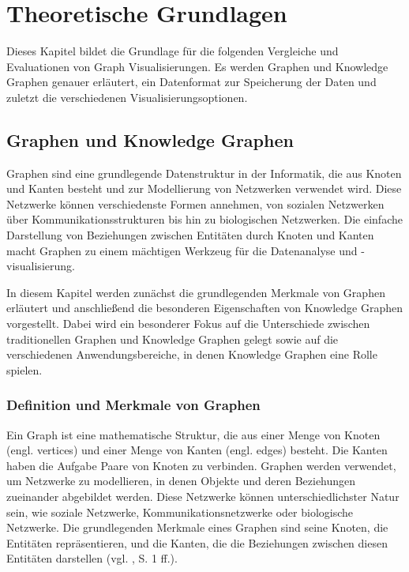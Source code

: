 
\chapter{Theoretische Grundlagen}
\label{theory}

Dieses Kapitel bildet die Grundlage für die folgenden Vergleiche und Evaluationen von Graph Visualisierungen. Es werden Graphen und Knowledge Graphen genauer erläutert, ein Datenformat zur Speicherung der Daten und zuletzt die verschiedenen Visualisierungsoptionen. 

\section{Graphen und Knowledge Graphen}

Graphen sind eine grundlegende Datenstruktur in der Informatik, die aus Knoten und Kanten besteht und zur Modellierung von Netzwerken verwendet wird. Diese Netzwerke können verschiedenste Formen annehmen, von sozialen Netzwerken über Kommunikationsstrukturen bis hin zu biologischen Netzwerken. Die einfache Darstellung von Beziehungen zwischen Entitäten durch Knoten und Kanten macht Graphen zu einem mächtigen Werkzeug für die Datenanalyse und -visualisierung.

In diesem Kapitel werden zunächst die grundlegenden Merkmale von Graphen erläutert und anschließend die besonderen Eigenschaften von Knowledge Graphen vorgestellt. Dabei wird ein besonderer Fokus auf die Unterschiede zwischen traditionellen Graphen und Knowledge Graphen gelegt sowie auf die verschiedenen Anwendungsbereiche, in denen Knowledge Graphen eine Rolle spielen.

\subsection{Definition und Merkmale von Graphen}

Ein Graph ist eine mathematische Struktur, die aus einer Menge von Knoten (engl. vertices) und einer Menge von Kanten (engl. edges) besteht. Die Kanten haben die Aufgabe Paare von Knoten zu verbinden. Graphen werden verwendet, um Netzwerke zu modellieren, in denen Objekte und deren Beziehungen zueinander abgebildet werden. Diese Netzwerke können unterschiedlichster Natur sein, wie soziale Netzwerke, Kommunikationsnetzwerke oder biologische Netzwerke. Die grundlegenden Merkmale eines Graphen sind seine Knoten, die Entitäten repräsentieren, und die Kanten, die die Beziehungen zwischen diesen Entitäten darstellen (vgl. \cite{graphIntroduction:Wilson}, S. 1 ff.).

